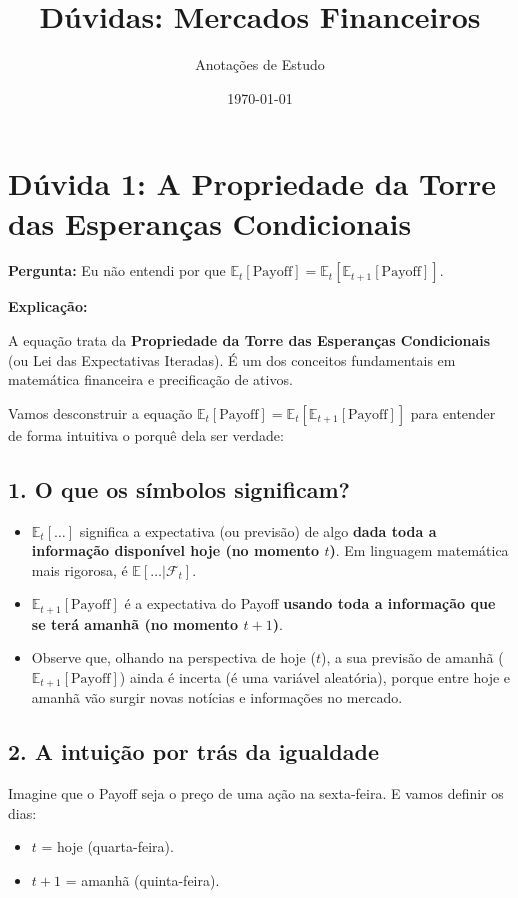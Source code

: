 \documentclass[12pt,a4paper]{article}
\title{Dúvidas: Mercados Financeiros}
\author{Anotações de Estudo}
\date{\today}
\begin{document}
\maketitle

\section{Dúvida 1: A Propriedade da Torre das Esperanças Condicionais}

\textbf{Pergunta:} Eu não entendi por que $\mathbb{E}_t[\text{Payoff}] = \mathbb{E}_t[\mathbb{E}_{t+1}[\text{Payoff}]]$.

\textbf{Explicação:}

A equação trata da \textbf{Propriedade da Torre das Esperanças Condicionais} (ou Lei das Expectativas Iteradas). É um dos conceitos fundamentais em matemática financeira e precificação de ativos.

Vamos desconstruir a equação $\mathbb{E}_t[\text{Payoff}] = \mathbb{E}_t[\mathbb{E}_{t+1}[\text{Payoff}]]$ para entender de forma intuitiva o porquê dela ser verdade:

\subsection{1. O que os símbolos significam?}
\begin{itemize}
    \item \textbf{$\mathbb{E}_t[\dots]$} significa a expectativa (ou previsão) de algo \textbf{dada toda a informação disponível hoje (no momento $t$)}. Em linguagem matemática mais rigorosa, é $\mathbb{E}[\dots | \mathcal{F}_t]$.
    \item \textbf{$\mathbb{E}_{t+1}[\text{Payoff}]$} é a expectativa do Payoff \textbf{usando toda a informação que se terá amanhã (no momento $t+1$)}.
    \item Observe que, olhando na perspectiva de hoje ($t$), a sua previsão de amanhã ($\mathbb{E}_{t+1}[\text{Payoff}]$) ainda é incerta (é uma variável aleatória), porque entre hoje e amanhã vão surgir novas notícias e informações no mercado.
\end{itemize}

\subsection{2. A intuição por trás da igualdade}
Imagine que o Payoff seja o preço de uma ação na sexta-feira. E vamos definir os dias:
\begin{itemize}
    \item $t$ = hoje (quarta-feira).
    \item $t+1$ = amanhã (quinta-feira).
\end{itemize}
\end{document}
